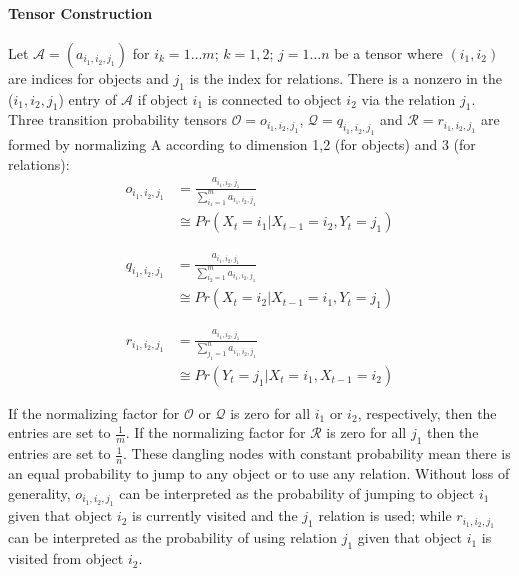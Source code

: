 \paragraph{Tensor Construction}
Let $\mathcal{A} = (a_{i_1,i_2,j_1})$ for $i_k=1 \ldots m$; $k=1,2$; $j=1 \ldots n$ be a tensor where $(i_1,i_2)$ are indices for objects and $j_1$ is the index for relations. There is a nonzero in the ($i_1,i_2,j_1$) entry of $\mathcal{A}$ if object $i_1$ is connected to object $i_2$ via the relation $j_1$. 
Three transition probability tensors $\mathcal{O}=o_{i_1,i_2,j_1}$, $\mathcal{Q}=q_{i_1,i_2,j_1}$ and $\mathcal{R}=r_{i_1,i_2,j_1}$ are formed by normalizing A according to dimension 1,2 (for objects) and 3 (for relations):
    \begin{equation}
        \label{eq:o_tensor}
        \begin{split}
        o_{i_1,i_2,j_1} &= \frac{a_{i_1,i_2,j_1}}{\sum_{i_1=1}^m a_{i_1,i_2,j_1}} \\
                        &\cong Pr(X_t=i_1|X_{t-1}=i_2,Y_t=j_1)
        \end{split}
    \end{equation}

    \begin{equation}
        \label{eq:q_tensor}
        \begin{split}
        q_{i_1,i_2,j_1} &= \frac{a_{i_1,i_2,j_1}}{\sum_{i_2=1}^m a_{i_1,i_2,j_1}} \\
                        &\cong Pr(X_t=i_2|X_{t-1}=i_1,Y_t=j_1) 
        \end{split}
    \end{equation}

    \begin{equation}
        \label{eq:r_tensor}
        \begin{split}
        r_{i_1,i_2,j_1} &= \frac{a_{i_1,i_2,j_1}}{\sum_{j_1=1}^n a_{i_1,i_2,j_1}} \\
                        &\cong Pr(Y_t=j_1|X_t=i_1,X_{t-1}=i_2)
        \end{split}
    \end{equation}

If the normalizing factor for $\mathcal{O}$ or $\mathcal{Q}$ is zero for all $i_1$ or $i_2$, respectively, then the entries are set to $\frac{1}{m}$. If the normalizing factor for $\mathcal{R}$ is zero for all $j_1$ then the entries are set to $\frac{1}{n}$. These dangling nodes with constant probability mean there is an equal probability to jump to any object or to use any relation. Without loss of generality, $o_{i_1,i_2,j_1}$ can be interpreted as the probability of jumping to object $i_1$ given that object $i_2$ is currently visited and the $j_1$ relation is used; while $r_{i_1,i_2,j_1}$ can be interpreted as the probability of using relation $j_1$ given that object $i_1$ is visited from object $i_2$.

